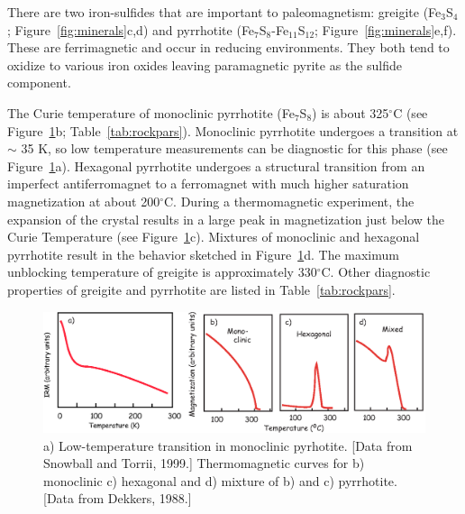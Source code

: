 There are two 
%
iron-sulfides that are important to paleomagnetism: 
%
greigite (Fe$_3$S$_4$; Figure~\ref{fig:minerals}c,d) and
%
pyrrhotite (Fe$_7$S$_8$-Fe$_{11}$S$_{12}$; Figure~\ref{fig:minerals}e,f).  These are ferrimagnetic and occur in reducing environments.  They 
both  tend to oxidize to various iron oxides leaving paramagnetic 
%
pyrite as the
sulfide component.  


The Curie temperature of 
monoclinic pyrrhotite (Fe$_7$S$_8$)
is about 325$^{\circ}$C (see Figure~\ref{fig:pyrrhotiteT}b; Table~\ref{tab:rockpars}). Monoclinic pyrrhotite undergoes a transition 
at $\sim$ 35 K, so low temperature measurements can be diagnostic for this phase (see Figure~\ref{fig:pyrrhotiteT}a).   
Hexagonal pyrrhotite undergoes a structural transition from an imperfect antiferromagnet to a ferromagnet with much higher saturation magnetization at about 200$^{\circ}$C.  During a thermomagnetic experiment, the expansion of the crystal results in a large peak  in magnetization just below the Curie Temperature (see Figure~\ref{fig:pyrrhotiteT}c).    Mixtures of monoclinic and hexagonal pyrrhotite result in the behavior sketched in Figure~\ref{fig:pyrrhotiteT}d.   
The maximum unblocking temperature of
 greigite is approximately
330$^{\circ}$C. 
 Other diagnostic properties of greigite and pyrrhotite are listed in 
Table~\ref{tab:rockpars}.




\begin{figure}[htb]
\centering
 \includegraphics[width=13 cm]{EPSfiles/pyrrhotiteT.eps}
\caption{a) Low-temperature transition in monoclinic pyrhotite. [Data from Snowball and Torrii, 1999.]
 Thermomagnetic curves for b) monoclinic c) hexagonal and d) mixture of b) and c) pyrrhotite.  [Data from Dekkers, 1988.]}
\label{fig:pyrrhotiteT}
\end{figure}
\nocite{dekkers88}


\nocite{snowball99}





